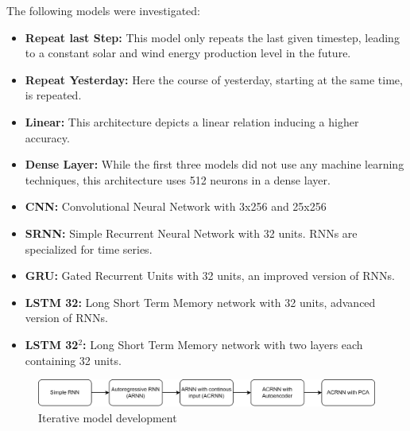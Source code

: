 \documentclass[11pt,table]{article}
\begin{document}
The following models were investigated:

\begin{itemize}
\item \textbf{Repeat last Step:} This model only repeats the last given timestep, leading to a constant solar and wind energy production level in the future. 
\item \textbf{Repeat Yesterday:} Here the course of yesterday, starting at the same time, is repeated. 
\item \textbf{Linear:} This architecture depicts a linear relation inducing a higher accuracy.
\item \textbf{Dense Layer:} While the first three models did not use any machine learning techniques, this architecture uses 512 neurons in a dense layer. 
\item \textbf{CNN:} Convolutional Neural Network with 3x256 and 25x256
\item \textbf{SRNN:} Simple Recurrent Neural Network with 32 units. RNNs are specialized for time series.
\item \textbf{GRU:} Gated Recurrent Units with 32 units, an improved version of RNNs. 
\item \textbf{LSTM 32:} Long Short Term Memory network with 32 units, advanced version of RNNs.
\item \textbf{LSTM 32$^2$:} Long Short Term Memory network with two layers each containing 32 units.
\end{itemize}


\begin{figure}[H]
	\centering
	\includegraphics[scale=1]{Figures/modelEvolution.png}
	\caption{Iterative model development}
	\label{fig:modelEvo}
\end{figure}
\end{document}
